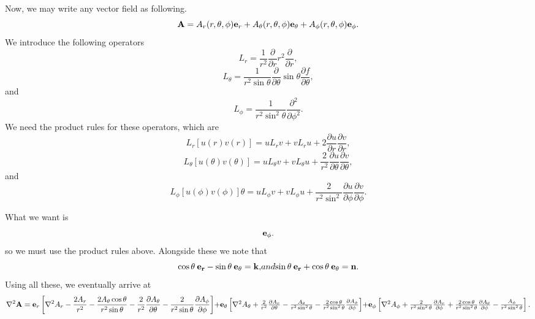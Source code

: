 Now, we may write any vector field as following.
\begin{equation}
{\bf A}=A_r(r, \theta, \phi){\bf e}_r
+A_\theta(r, \theta, \phi){\bf e}_\theta+A_\phi(r, \theta, \phi)
 {\bf e}_\phi.
\end{equation}
We introduce the following operators
\begin{equation}
L_r=\frac{1}{r^2} \frac{\partial}{\partial r} 
 r^2 \frac{\partial}{\partial r}, 
\end{equation}
\begin{equation}
L_\theta=
\frac{1}{r^2 \sin \theta} \frac{\partial }{\partial \theta}
\sin \theta \frac{\partial f }{\partial \theta}, 
\end{equation}
and
\begin{equation}
L_\phi=\frac{1}{r^2 \sin^2 \theta}
\frac{\partial^2}{\partial \phi^2}.
\end{equation}
We need the product rules for these operators, which are
\begin{equation}
L_r[u(r)v(r)]
= u L_r v  +v L_r u + 
2 \frac{\partial u}{\partial r}
 \frac{\partial v}{\partial r},
\end{equation}
\begin{equation}
L_\theta[u(\theta)v(\theta)]
= u L_\theta v +v L_\theta u + 
\frac{2}{r^2} \frac{\partial u}{\partial \theta}
 \frac{\partial v}{\partial \theta},
\end{equation}
and
\begin{equation}
L_\phi [u(\phi)v(\phi)]
\theta
= u L_\phi v +v L_\phi u + 
\frac{2}{r^2 \sin^2} \frac{\partial u}{\partial \phi}
 \frac{\partial v}{\partial \phi}.
\end{equation}

What we want is 
\begin{equation}
[L_r+L_\theta+L_\phi][A_r(r, \theta, \phi){\bf e}_r
+A_\theta(r, \theta, \phi){\bf e}_\theta+A_\phi(r, \theta, \phi)]
 {\bf e}_\phi.
\end{equation}
so we must use the product rules above. Alongside these we note that
\begin{equation}
\cos \theta \> {\bf e_r}-\sin \theta \> {\bf e}_\theta
={\bf k}, 
$$ and   $$
\sin  \theta \> {\bf e_r}+\cos  \theta \> {\bf e}_\theta
={\bf n}.
\end{equation}
Using all these, we eventually arrive at
\begin{equation}
\nabla^2 {\bf A}
={\bf e}_r \left \lbrack
\nabla^2 A_r -\frac{2 A_r}{r^2}
- \frac{ 2 A_\theta \cos \theta}{r^2 \sin \theta}
- \frac{2}{r^2} \frac{\partial A_\theta}{\partial \theta}
-\frac{2}{r^2 \sin \theta} \frac{\partial A_\phi}{\partial \phi}
\right \rbrack
$$    $$
+ {\bf e_\theta} \left \lbrack
\nabla^2 A_\theta + 
\frac{2}{r^2} \frac{\partial A_r}{\partial \theta}
-\frac{A_\theta}{r^2 \sin^2 \theta}
-\frac{2 \cos \theta}{r^2 \sin^2 \theta} 
\frac{\partial A_\phi}{\partial \phi} \right \rbrack
$$   $$
+{\bf e_\phi} \left \lbrack
\nabla^2 A_\phi
+ \frac{2}{r^2 \sin^2 \theta} \frac{\partial A_r}{\partial \phi}
+ \frac{2 \cos \theta}{r^2 \sin^2 \theta}
\frac{\partial A_\theta}{\partial \phi}
-\frac{A_\phi}{r^2 \sin^2 \theta} \right \rbrack.
\end{equation}

